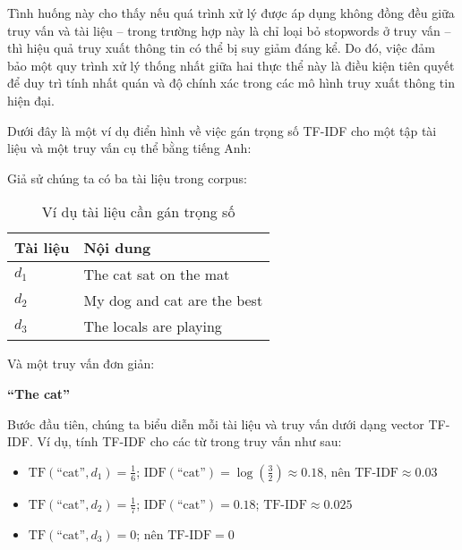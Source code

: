 Tình huống này cho thấy nếu quá trình xử lý được áp dụng không đồng đều giữa truy vấn và tài liệu -- trong trường hợp này là chỉ loại bỏ stopwords ở truy vấn -- thì hiệu quả truy xuất thông tin có thể bị suy giảm đáng kể. Do đó, việc đảm bảo một quy trình xử lý thống nhất giữa hai thực thể này là điều kiện tiên quyết để duy trì tính nhất quán và độ chính xác trong các mô hình truy xuất thông tin hiện đại.

Dưới đây là một ví dụ điển hình về việc gán trọng số TF-IDF cho một tập tài liệu và một truy vấn cụ thể bằng tiếng Anh:

Giả sử chúng ta có ba tài liệu trong corpus:

\begin{table}[H]
    \caption{Ví dụ tài liệu cần gán trọng số}
    \begin{center}
        \begin{tabularx}{0.7\linewidth}{l || X}
            \toprule
            \textbf{Tài liệu} & \textbf{Nội dung}           \\
            \midrule\midrule
            \(d_1\)           & The cat sat on the mat      \\
            \(d_2\)           & My dog and cat are the best \\
            \(d_3\)           & The locals are playing      \\
            \bottomrule
        \end{tabularx}
    \end{center}
\end{table}

Và một truy vấn đơn giản:

\begin{center}
    \textbf{``The cat''}
\end{center}

Bước đầu tiên, chúng ta biểu diễn mỗi tài liệu và truy vấn dưới dạng vector TF-IDF. Ví dụ, tính TF-IDF cho các từ trong truy vấn như sau:

\begin{itemize}
    \item \(\text{TF}(\text{``cat''}, d_{1}) = \frac{1}{6}\); \(\text{IDF}(\text{``cat''}) = \log\left(\frac{3}{2}\right) \approx 0.18\), nên \(\text{TF-IDF} \approx 0.03\)
    \item \(\text{TF}(\text{``cat''}, d_{2}) = \frac{1}{7}\); \(\text{IDF}(\text{``cat''}) = 0.18\); \(\text{TF-IDF} \approx 0.025\)
    \item \(\text{TF}(\text{``cat''}, d_{3}) = 0\); nên \(\text{TF-IDF} = 0\)
\end{itemize}

